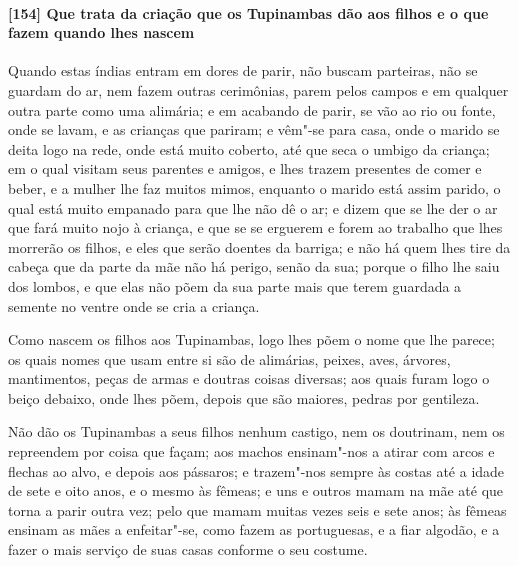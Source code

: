 \paragraph{[154] Que trata da criação que os Tupinambas dão aos filhos e o que fazem quando
lhes nascem}\quad
Quando estas índias entram em dores de parir, não buscam parteiras, não se guardam do ar,
nem fazem outras cerimônias, parem pelos campos e em qualquer outra parte como uma
alimária; e em acabando de parir, se vão ao rio ou fonte, onde se lavam, e as crianças que
pariram; e vêm"-se para casa, onde o marido se deita logo na rede, onde está muito coberto,
até que seca o umbigo da criança; em o qual visitam seus parentes e amigos, e lhes trazem
presentes de comer e beber, e a mulher lhe faz muitos mimos, enquanto o marido está assim
parido, o qual está muito empanado para que lhe não dê o ar; e dizem que se lhe der o ar
que fará muito nojo à criança, e que se se erguerem e forem ao trabalho que lhes morrerão
os filhos, e eles que serão doentes da barriga; e não há quem lhes tire da cabeça que da
parte da mãe não há perigo, senão da sua; porque o filho lhe saiu dos lombos, e que elas
não põem da sua parte mais que terem guardada a semente no ventre onde se cria a criança.

Como nascem os filhos aos Tupinambas, logo lhes põem o nome que lhe parece; os quais nomes
que usam entre si são de alimárias, peixes, aves, árvores, mantimentos, peças de armas e
doutras coisas diversas; aos quais furam logo o beiço debaixo, onde lhes põem, depois que
são maiores, pedras por gentileza.

Não dão os Tupinambas a seus filhos nenhum castigo, nem os doutrinam, nem os repreendem
por coisa que façam; aos machos ensinam"-nos a atirar com arcos e flechas ao alvo, e depois
aos pássaros; e trazem"-nos sempre às costas até a idade de sete e oito anos, e o mesmo às
fêmeas; e uns e outros mamam na mãe até que torna a parir outra vez; pelo que mamam muitas
vezes seis e sete anos; às fêmeas ensinam as mães a enfeitar"-se, como fazem as
portuguesas, e a fiar algodão, e a fazer o mais serviço de suas casas conforme o seu costume.



